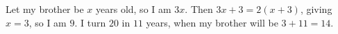 Let my brother be \(x\) years old, so I am \(3x\). Then \(3x+3=2(x+3)\), giving \(x=3\), so I am \(9\). I turn \(20\) in \(11\) years, when my brother will be \(3+11=\boxed{14}\).
